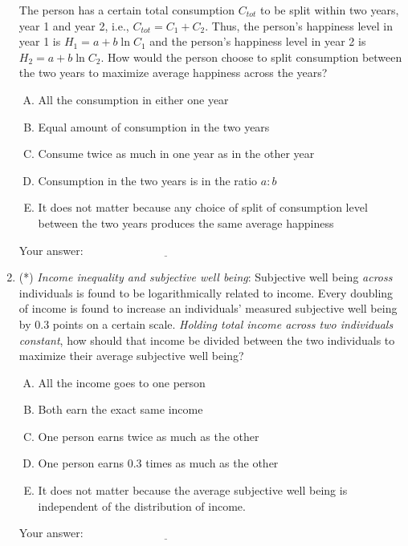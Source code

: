 \documentclass[10pt]{amsart}
\begin{document}
\begin{enumerate}
  The person has a certain total consumption $C_{tot}$ to be split
  within two years, year 1 and year 2, i.e., $C_{tot} = C_1 +
  C_2$. Thus, the person's happiness level in year 1 is $H_1 = a + b
  \ln C_1$ and the person's happiness level in year 2 is $H_2 = a + b
  \ln C_2$. How would the person choose to split consumption between
  the two years to maximize average happiness across the years?

  \begin{enumerate}[(A)]
  \item All the consumption in either one year
  \item Equal amount of consumption in the two years
  \item Consume twice as much in one year as in the other year
  \item Consumption in the two years is in the ratio $a:b$
  \item It does not matter because any choice of split of consumption
    level between the two years produces the same average happiness
  \end{enumerate}

  \vspace{0.1in}
  Your answer: $\underline{\qquad\qquad\qquad\qquad\qquad\qquad\qquad}$
  \vspace{0.6in}

\item (*) {\em Income inequality and subjective well being}:
  Subjective well being {\em across} individuals is found to be
  logarithmically related to income. Every doubling of income is found
  to increase an individuals' measured subjective well being by $0.3$
  points on a certain scale. {\em Holding total income across two
  individuals constant}, how should that income be divided between the
  two individuals to maximize their average subjective well being?

  \begin{enumerate}[(A)]
  \item All the income goes to one person
  \item Both earn the exact same income
  \item One person earns twice as much as the other
  \item One person earns $0.3$ times as much as the other
  \item It does not matter because the average subjective well being
  is independent of the distribution of income.
  \end{enumerate}

  \vspace{0.1in}
  Your answer: $\underline{\qquad\qquad\qquad\qquad\qquad\qquad\qquad}$
  \vspace{0.6in}

\end{enumerate}
\end{document}
